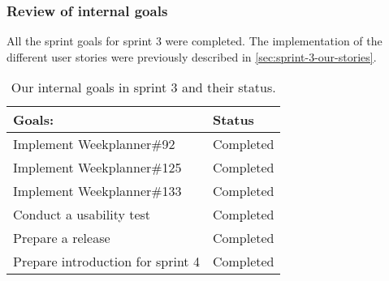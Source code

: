 \subsubsection{Review of internal goals}
All the sprint goals for sprint 3 were completed.
The implementation of the different user stories were previously described in \autoref{sec:sprint-3-our-stories}.
\begin{table}[H]
    \centering
    \begin{tabular}{|l|l|}
    \hline
    Goals:                            & Status        \\ \hline
    Implement Weekplanner\#92         & Completed      \\ \hline
    Implement Weekplanner\#125        & Completed      \\ \hline
    Implement Weekplanner\#133        & Completed      \\ \hline
    Conduct a usability test          & Completed       \\ \hline
    Prepare a release                 & Completed         \\ \hline
    Prepare introduction for sprint 4 & Completed                        \\ \hline
    \end{tabular}
    \caption{Our internal goals in sprint 3 and their status.}
    \label{PO-goal-sprint-3}
\end{table}
